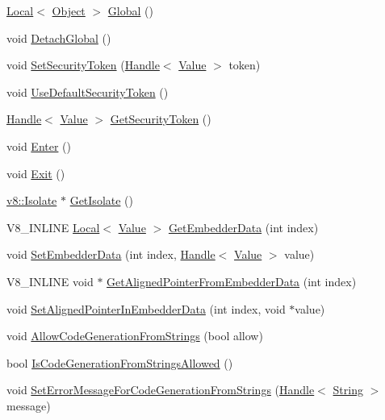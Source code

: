 \begin{DoxyCompactItemize}
\item 
\hyperlink{classv8_1_1Local}{Local}$<$ \hyperlink{classv8_1_1Object}{Object} $>$ \hyperlink{classv8_1_1Context_af5cd9f97ef6a3307c1c21f80f4b743eb}{Global} ()
\item 
void \hyperlink{classv8_1_1Context_a841c7dd92eb8c57df92a268a164dea97}{Detach\+Global} ()
\item 
void \hyperlink{classv8_1_1Context_a288d8549547f6bdf4312f5333f60f24d}{Set\+Security\+Token} (\hyperlink{classv8_1_1Handle}{Handle}$<$ \hyperlink{classv8_1_1Value}{Value} $>$ token)
\item 
void \hyperlink{classv8_1_1Context_aa9e1a14982b64fd51ab87600a287bad2}{Use\+Default\+Security\+Token} ()
\item 
\hyperlink{classv8_1_1Handle}{Handle}$<$ \hyperlink{classv8_1_1Value}{Value} $>$ \hyperlink{classv8_1_1Context_a8e71e658633518ca7718c0f6e938c6a9}{Get\+Security\+Token} ()
\item 
void \hyperlink{classv8_1_1Context_a6995c49d9897eb49053f07874b825133}{Enter} ()
\item 
void \hyperlink{classv8_1_1Context_a2db09d4fefb26023a40d88972a4c1599}{Exit} ()
\item 
\hyperlink{classv8_1_1Isolate}{v8\+::\+Isolate} $\ast$ \hyperlink{classv8_1_1Context_af55552d8658ecb20eff7af2c83e8ede2}{Get\+Isolate} ()
\item 
V8\+\_\+\+I\+N\+L\+I\+N\+E \hyperlink{classv8_1_1Local}{Local}$<$ \hyperlink{classv8_1_1Value}{Value} $>$ \hyperlink{classv8_1_1Context_a9cfafe0ac56f6aee17eb80a913489296}{Get\+Embedder\+Data} (int index)
\item 
void \hyperlink{classv8_1_1Context_ae18e007074770872e78e0040f36de8c6}{Set\+Embedder\+Data} (int index, \hyperlink{classv8_1_1Handle}{Handle}$<$ \hyperlink{classv8_1_1Value}{Value} $>$ value)
\item 
V8\+\_\+\+I\+N\+L\+I\+N\+E void $\ast$ \hyperlink{classv8_1_1Context_aa3b5c1a1a5d145c6096840898013f559}{Get\+Aligned\+Pointer\+From\+Embedder\+Data} (int index)
\item 
void \hyperlink{classv8_1_1Context_a522063c88e4c2832f5ff4f3980815f58}{Set\+Aligned\+Pointer\+In\+Embedder\+Data} (int index, void $\ast$value)
\item 
void \hyperlink{classv8_1_1Context_a794ccc42113566f5d363f89c8b0d3c2c}{Allow\+Code\+Generation\+From\+Strings} (bool allow)
\item 
bool \hyperlink{classv8_1_1Context_aa7a960a232d232d1a2a904c2e6c18831}{Is\+Code\+Generation\+From\+Strings\+Allowed} ()
\item 
void \hyperlink{classv8_1_1Context_a6a8d067b246b8792b19e8075bc410f1d}{Set\+Error\+Message\+For\+Code\+Generation\+From\+Strings} (\hyperlink{classv8_1_1Handle}{Handle}$<$ \hyperlink{classv8_1_1String}{String} $>$ message)
\end{DoxyCompactItemize}
